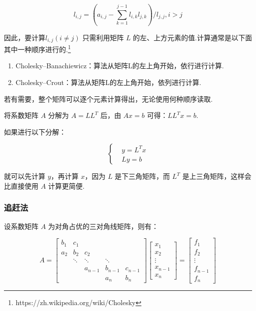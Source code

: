 \[
    l_{i,j} = (a_{i,j} - \sum_{k=1}^{j-1}l_{i,k}l_{j,k}) / l_{j,j},  i > j
\]

因此，要计算${l}_{i,j}(i\neq j)$ 只需利用矩阵 $L$ 的左、上方元素的值.计算通常是以下面其中一种顺序进行的.\footnote{https://zh.wikipedia.org/wiki/Cholesky}

\begin{enumerate}
    \item Cholesky–Banachiewicz：算法从矩阵L的左上角开始，依行进行计算.
    \item Cholesky–Crout：算法从矩阵L的左上角开始，依列进行计算.
\end{enumerate}

若有需要，整个矩阵可以逐个元素计算得出，无论使用何种顺序读取.

将系数矩阵 \(A\) 分解为 \(A = L L^T\) 后，由 \(Ax = b\)
可得：\(LL^Tx = b\).

如果进行以下分解：

\[
    \left\{\begin{aligned}
         & y  = L^Tx \\
         & Ly = b
    \end{aligned}\right.
\]


就可以先计算 \(y\)，再计算 \(x\)，因为 \(L\) 是下三角矩阵，而 \(L^T\)
是上三角矩阵，这样会比直接使用 \(A\) 计算更简便.

\subsubsection{追赶法}

设系数矩阵 $A$ 为对角占优的三对角线矩阵，则有：

\begin{equation}
    A =
    \begin{bmatrix}
        b_1 & c_1                                  \\
        a_2 & b_2    & c_2                         \\
            & \ddots & \ddots  & \ddots            \\
            &        & a_{n-1} & b_{n-1} & c_{n-1} \\
            &        &         & a_n     & b_n
    \end{bmatrix}
    \begin{bmatrix}
        x_1     \\
        x_2     \\
        \vdots  \\
        x_{n-1} \\
        x_n
    \end{bmatrix}
    =
    \begin{bmatrix}
        f_1     \\
        f_2     \\
        \vdots  \\
        f_{n-1} \\
        f_n
    \end{bmatrix}
    \label{追赶法:三对角线方程组}
\end{equation}


